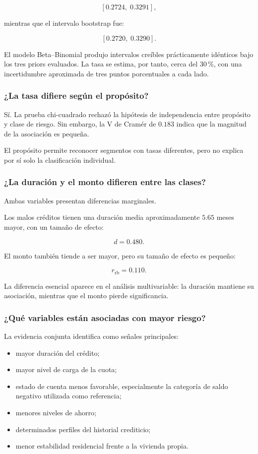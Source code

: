 \[
[0.2724,\;0.3291],
\]

mientras que el intervalo bootstrap fue:

\[
[0.2720,\;0.3290].
\]

El modelo Beta--Binomial produjo intervalos creíbles prácticamente
idénticos bajo los tres priors evaluados. La tasa se estima, por tanto,
cerca del \(30\,\%\), con una incertidumbre aproximada de tres puntos
porcentuales a cada lado.

\subsubsection{¿La tasa difiere según el propósito?}

Sí. La prueba chi-cuadrado rechazó la hipótesis de independencia entre
propósito y clase de riesgo. Sin embargo, la V de Cramér de \(0.183\)
indica que la magnitud de la asociación es pequeña.

El propósito permite reconocer segmentos con tasas diferentes, pero no
explica por sí solo la clasificación individual.

\subsubsection{¿La duración y el monto difieren entre las clases?}

Ambas variables presentan diferencias marginales.

Los malos créditos tienen una duración media aproximadamente
\(5.65\) meses mayor, con un tamaño de efecto:

\[
d=0.480.
\]

El monto también tiende a ser mayor, pero su tamaño de efecto es pequeño:

\[
r_{\mathrm{rb}}
=
0.110.
\]

La diferencia esencial aparece en el análisis multivariable: la duración
mantiene su asociación, mientras que el monto pierde significancia.

\subsubsection{¿Qué variables están asociadas con mayor riesgo?}

La evidencia conjunta identifica como señales principales:

\begin{itemize}
    \item mayor duración del crédito;

    \item mayor nivel de carga de la cuota;

    \item estado de cuenta menos favorable, especialmente la categoría
    de saldo negativo utilizada como referencia;

    \item menores niveles de ahorro;

    \item determinados perfiles del historial crediticio;

    \item menor estabilidad residencial frente a la vivienda propia.
\end{itemize}

